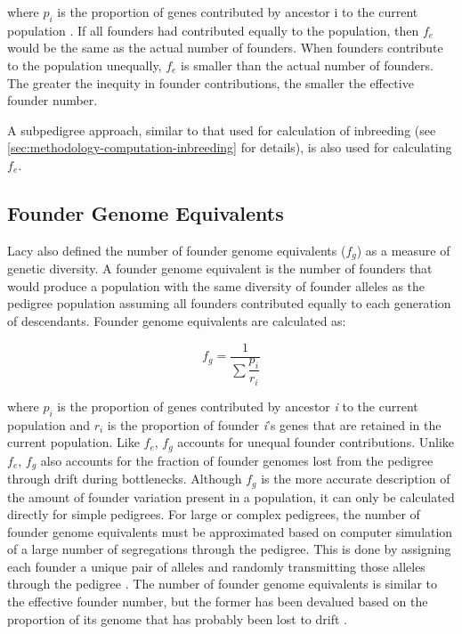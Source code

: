 where $p_i$ is the proportion of genes contributed by ancestor i to the current population \cite{ref640}. If all founders
had contributed equally to the population, then $f_e$ would be the same as the actual number of founders.  When founders
contribute to the population unequally, $f_e$ is smaller than the actual number of founders. The greater the inequity in
founder contributions, the smaller the effective founder number.

A subpedigree approach, similar to that used for calculation of inbreeding (see \ref{sec:methodology-computation-inbreeding} for details), is also used for calculating $f_e$.
\subsection{Founder Genome Equivalents}
\label{sec:methodology-computation-founder-genome-equivalents}
Lacy \citeyear{ref640} also defined the number of founder genome equivalents ($f_g$) as a measure of genetic diversity.  A
founder genome equivalent is the number of founders that would produce a population with the same diversity of founder alleles
as the pedigree population assuming all founders contributed equally to each generation of descendants. Founder genome
equivalents are calculated as:

\[ f_g = \dfrac{ 1 } { \sum{ \dfrac{p_i} {r_i} } } \]

where $p_i$ is the proportion of genes contributed by ancestor \textit{i} to the current population and $r_i$ is the
proportion of founder \textit{i}'s genes that are retained in the current population.  Like $f_e$, $f_g$ accounts for
unequal founder contributions.  Unlike $f_e$, $f_g$ also accounts for the fraction of founder genomes lost from the
pedigree through drift during bottlenecks. Although $f_g$ is the more accurate description of the amount of founder variation
present in a population, it can only be calculated directly for simple pedigrees. For large or complex pedigrees, the number of
founder genome equivalents must be approximated based on computer simulation of a large number of segregations through the
pedigree. This is done by assigning each founder a unique pair of alleles and randomly transmitting those alleles through the
pedigree \cite{ref1719}. The number of founder genome equivalents is similar to the effective founder number, but the former
has been devalued based on the proportion of its genome that has probably been lost to drift \cite{ref640}.
